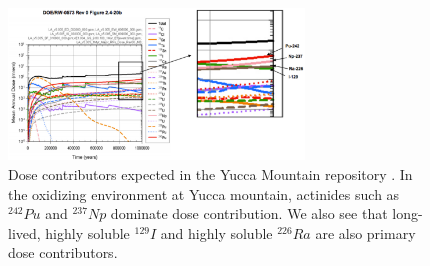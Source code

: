 \begin{figure}[htbp!]
  \begin{center}
    \includegraphics[width=0.7\textwidth]{swift_dose_yucca.eps}
  \end{center}
  \caption{Dose contributors expected in the Yucca Mountain repository 
    \cite{swift_applying_2010}. In the oxidizing environment at Yucca mountain, 
    actinides such as $^{242}Pu$ and $^{237}Np$ dominate dose contribution. We 
    also see that long-lived, highly soluble $^{129}I$ and highly soluble 
    $^{226}Ra$ are also primary dose contributors.}
  \label{fig:swift_dose_yucca}
\end{figure}

